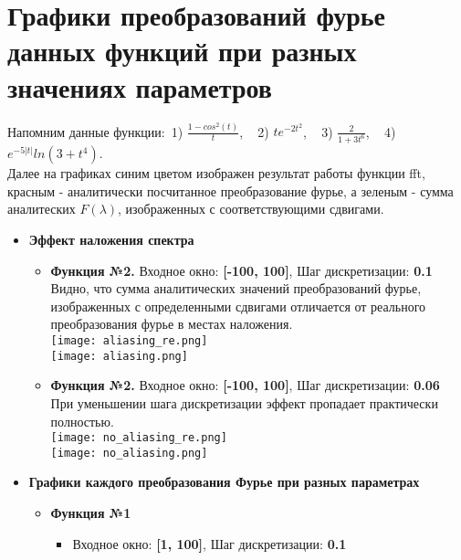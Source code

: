 \documentclass[11pt]{article}
\begin{document}
\section{Графики преобразований фурье данных функций при разных значениях параметров}
Напомним данные функции:~1) \( \frac{1 - cos^2(t)}{t} \), ~ 2) \( te^{-2t^2}\), ~ 3) \( \frac{2}{1 + 3t^6} \), ~ 4) \( e^{-5|t|}ln(3+t^4) \). \bigskip \\
Далее на графиках синим цветом изображен результат работы функции fft, красным - аналитически посчитанное преобразование фурье, а зеленым - сумма аналитеских \(F(\lambda)\), изображенных с соответствующими сдвигами. \bigskip \\
\newpage
\begin{itemize}
	\item \textbf{Эффект наложения спектра} \\
	\begin{itemize}
		\item \textbf{Функция №2.} Входное окно: \textbf{[-100, 100]}, Шаг дискретизации: \textbf{0.1} \medskip \\
			Видно, что сумма аналитических значений преобразований фурье, изображенных с определенными сдвигами отличается от реального преобразования фурье в местах наложения.\bigskip \\
			\texttt{[image: aliasing\_re.png]}\\
			\texttt{[image: aliasing.png]}\\
		\item \textbf{Функция №2.} Входное окно: \textbf{[-100, 100]}, Шаг дискретизации: \textbf{0.06} \medskip \\
			При уменьшении шага дискретизации эффект пропадает практически полностью. \bigskip \\
			\texttt{[image: no\_aliasing\_re.png]}\\
			\texttt{[image: no\_aliasing.png]}\\
	\end{itemize} 
	\newpage
	\item \textbf{Графики каждого преобразования Фурье при разных параметрах}
	\begin{itemize}
		\item \textbf{Функция №1}
			\begin{itemize}	
				\item Входное окно: \textbf{[1, 100]}, Шаг дискретизации: \textbf{0.1} \medskip \\

\end{itemize}
\end{itemize}
\end{itemize}
\end{document}
